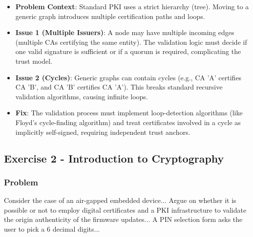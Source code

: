 \documentclass{article}
\begin{document}
\begin{itemize}
    \item \textbf{Problem Context}: Standard PKI uses a strict hierarchy (tree). Moving to a generic graph introduces multiple certification paths and loops.
    \item \textbf{Issue 1 (Multiple Issuers)}: A node may have multiple incoming edges (multiple CAs certifying the same entity). The validation logic must decide if one valid signature is sufficient or if a quorum is required, complicating the trust model.
    \item \textbf{Issue 2 (Cycles)}: Generic graphs can contain cycles (e.g., CA 'A' certifies CA 'B', and CA 'B' certifies CA 'A'). This breaks standard recursive validation algorithms, causing infinite loops.
    \item \textbf{Fix}: The validation process must implement loop-detection algorithms (like Floyd's cycle-finding algorithm) and treat certificates involved in a cycle as implicitly self-signed, requiring independent trust anchors.
\end{itemize}

\subsection{Exercise 2 - Introduction to Cryptography}
\subsubsection*{Problem}
Consider the case of an air-gapped embedded device... Argue on whether it is possible or not to employ digital certificates and a PKI infrastructure to validate the origin authenticity of the firmware updates... A PIN selection form asks the user to pick a 6 decimal digits...
\end{document}
